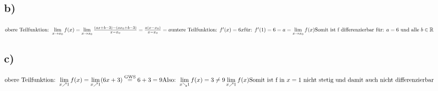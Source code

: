 \documentclass[a4paper, 11pt]{article}
\begin{document}
\subsection{b)}
\label{sec:org8f80267}
\begin{math}
    \text{obere Teilfunktion: }
    \newline
    \lim \limits_{x \to x_0} f(x) =
        \lim \limits_{x \to x_0} \frac{(ax + b - 3) -
            (ax_0 + b - 3)}{x - x_0} = \frac{a(x - x_0)}{x - x_0} = a
    \newline
    \newline
    \text{untere Teilfunktion: }
    \newline
    f'(x) = 6x
    \newline
    \text{für: }f'(1) = 6 = a = \lim \limits_{x \to x_0} f(x)
    \newline
    \newline
    \text{Somit ist f differenzierbar für: } a = 6 \text{ und alle } b \in \mathbb{R}
\end{math}

\subsection{c)}
\label{sec:org15af5c6}
\begin{math}
    \text{obere Teilfunktion: }
    \newline
    \lim \limits_{x \nearrow 1} f(x) =
        \lim \limits_{x \nearrow 1} (6x + 3) \overset{\text{GWS}}{=} 6 + 3 = 9
    \newline
    \newline
    \text{Also: }\lim \limits_{x \searrow 1} f(x) =
        3 \neq 9 \lim \limits_{x \nearrow 1} f(x)
    \newline
    \newline
    \text{Somit ist f in } x = 1
    \text{ nicht stetig und damit auch nicht differenzierbar}
\end{math}
\end{document}
